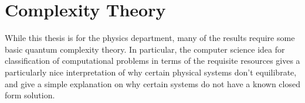 \documentclass[../thesis-main/thesis-main]{subfiles}
\begin{document}
%

%
%
%
%

\section{Complexity Theory}
\label{sec:complexity_theory}

While this thesis is for the physics department, many of the results require some basic quantum complexity theory.  In particular, the computer science idea for classification of computational problems in terms of the requisite resources gives a particularly nice interpretation of why certain physical systems don't equilibrate, and give a simple explanation on why certain systems do not have a known closed form solution.
\end{document}

